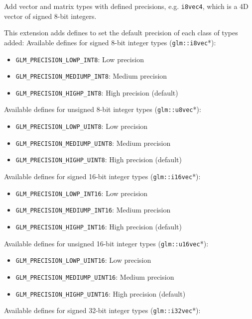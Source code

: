 \documentclass{scrartcl}
\numberwithin{figure}{subsection}
\begin{document}
Add vector and matrix types with defined precisions, e.g. \verb|i8vec4|, which is a 4D vector of signed 8-bit integers.

This extension adds defines to set the default precision of each class of types added:
Available defines for signed 8-bit integer types (\verb|glm::i8vec|*):

\begin{itemize}
    \item \verb|GLM_PRECISION_LOWP_INT8|: Low precision
    \item \verb|GLM_PRECISION_MEDIUMP_INT8|: Medium precision 
    \item \verb|GLM_PRECISION_HIGHP_INT8|: High precision (default)
\end{itemize}

Available defines for unsigned 8-bit integer types (\verb|glm::u8vec|*):

\begin{itemize}
    \item \verb|GLM_PRECISION_LOWP_UINT8|: Low precision
    \item \verb|GLM_PRECISION_MEDIUMP_UINT8|: Medium precision 
    \item \verb|GLM_PRECISION_HIGHP_UINT8|: High precision (default)
\end{itemize}

Available defines for signed 16-bit integer types (\verb|glm::i16vec|*):

\begin{itemize}
    \item \verb|GLM_PRECISION_LOWP_INT16|: Low precision
    \item \verb|GLM_PRECISION_MEDIUMP_INT16|: Medium precision 
    \item \verb|GLM_PRECISION_HIGHP_INT16|: High precision (default)
\end{itemize}

Available defines for unsigned 16-bit integer types (\verb|glm::u16vec|*):

\begin{itemize}
    \item \verb|GLM_PRECISION_LOWP_UINT16|: Low precision
    \item \verb|GLM_PRECISION_MEDIUMP_UINT16|: Medium precision 
    \item \verb|GLM_PRECISION_HIGHP_UINT16|: High precision (default)
\end{itemize}

Available defines for signed 32-bit integer types (\verb|glm::i32vec|*):
\end{document}
